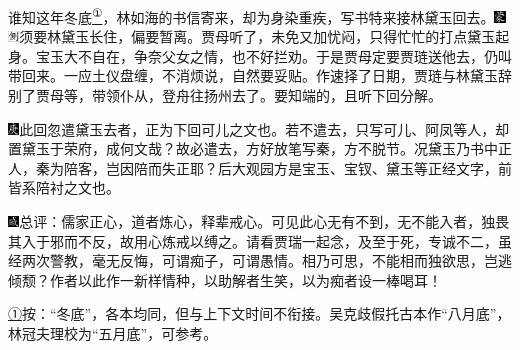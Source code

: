 谁知这年冬底\href{../Text/part0016_split_000.html\#lnkback_1_a}{\textsuperscript{①}}，林如海的书信寄来，却为身染重疾，写书特来接林黛玉回去。{\includegraphics[width=3mm]{../Images/00006}\includegraphics[width=3mm]{../Images/00011}\footnotesize \kaishu 须要林黛玉长住，偏要暂离。}贾母听了，未免又加忧闷，只得忙忙的打点黛玉起身。宝玉大不自在，争奈父女之情，也不好拦劝。于是贾母定要贾琏送他去，仍叫带回来。一应土仪盘缠，不消烦说，自然要妥贴。作速择了日期，贾琏与林黛玉辞别了贾母等，带领仆从，登舟往扬州去了。要知端的，且听下回分解。

{{\includegraphics[width=3mm]{../Images/00004}此回忽遣黛玉去者，正为下回可儿之文也。若不遣去，只写可儿、阿凤等人，却置黛玉于荣府，成何文哉？故必遣去，方好放笔写秦，方不脱节。况黛玉乃书中正人，秦为陪客，岂因陪而失正耶？后大观园方是宝玉、宝钗、黛玉等正经文字，前皆系陪衬之文也。}}

{\includegraphics[width=3mm]{../Images/00005}总评：儒家正心，道者炼心，释辈戒心。可见此心无有不到，无不能入者，独畏其入于邪而不反，故用心炼戒以缚之。请看贾瑞一起念，及至于死，专诚不二，虽经两次警教，毫无反悔，可谓痴子，可谓愚情。相乃可思，不能相而独欲思，岂逃倾颓？作者以此作一新样情种，以助解者生笑，以为痴者设一棒喝耳！}

{\href{../Text/part0016_split_000.html\#navto_1_a}{①}按：``冬底''，各本均同，但与上下文时间不衔接。吴克歧假托古本作``八月底''，林冠夫理校为``五月底''，可参考。}
